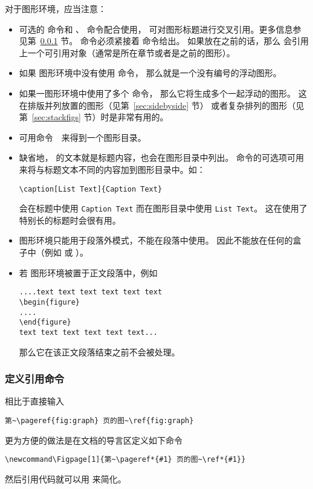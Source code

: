 对于图形环境，应当注意：
\begin{itemize}
	\item 可选的  命令和 、 命令配合使用，
	可对图形标题进行交叉引用。更多信息参见第~\ref{sssec:refcmd} 节。
	 命令必须紧接着  命令给出。
	如果放在之前的话，那么  会引用上一个可引用对象（通常是所在章节或者是之前的图形）。
	
	\item 如果  图形环境中没有使用  命令，
	那么就是一个没有编号的浮动图形。
	
	\item 如果一图形环境中使用了多个  命令，
	那么它将生成多个一起浮动的图形。
	这在排版并列放置的图形（见第~\ref{sec:sidebyside} 节）
	或者复杂排列的图形（见第~\ref{sec:stackfigs} 节）时是非常有用的。
	
	\item 可用命令~~来得到一个图形目录。
	\item 缺省地， 的文本就是标题内容，也会在图形目录中列出。
	 命令的可选项可用来将与标题文本不同的内容加到图形目录中。如：
\begin{lstlisting}
\caption[List Text]{Caption Text}
\end{lstlisting}
	会在标题中使用 \texttt{Caption Text} 而在图形目录中使用 \texttt{List Text}。
	这在使用了特别长的标题时会很有用。
	
	\item {} 图形环境只能用于段落外模式，不能在段落中使用。
	因此不能放在任何的盒子中（例如  或 ）。
	
	\item 若  图形环境被置于正文段落中，例如
\begin{lstlisting}
....text text text text text text 
\begin{figure} 
.... 
\end{figure} 
text text text text text text...      
\end{lstlisting}
	那么它在该正文段落结束之前不会被处理。
\end{itemize}

\subsubsection{定义引用命令}\label{sssec:refcmd}
相比于直接输入
\begin{lstlisting}
第~\pageref{fig:graph} 页的图~\ref{fig:graph}
\end{lstlisting}
更为方便的做法是在文档的导言区定义如下命令
\begin{lstlisting}
\newcommand\Figpage[1]{第~\pageref*{#1} 页的图~\ref*{#1}}
\end{lstlisting}
然后引用代码就可以用  来简化。

